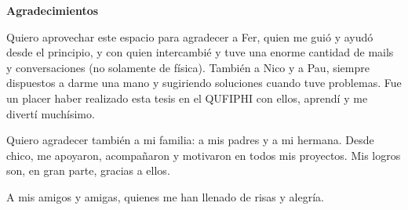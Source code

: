\newenvironment{agradecimientos}%
{\thispagestyle{empty} \cleardoublepage\null \thispagestyle{empty} \vfill\begin{center}%
\textbf{Agradecimientos} \end{center}}%
{\thispagestyle{empty} \vfill\null }

\begin{agradecimientos}
Quiero aprovechar este espacio para agradecer a Fer, quien me guió y ayudó desde el principio, y con quien intercambié y tuve una enorme cantidad de mails y conversaciones (no solamente de física). También a Nico y a Pau, siempre dispuestos a darme una mano y sugiriendo soluciones cuando tuve problemas. Fue un placer haber realizado esta tesis en el QUFIPHI con ellos, aprendí y me divertí muchísimo.

Quiero agradecer también a mi familia: a mis padres y a mi hermana. Desde chico, me apoyaron, acompañaron y motivaron en todos mis proyectos. Mis logros son, en gran parte, gracias a ellos.

A mis amigos y amigas, quienes me han llenado de risas y alegría.  

\end{agradecimientos}
%
%
% 
\null